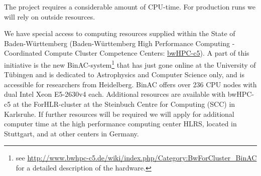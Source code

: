 \documentclass[10pt,fleqn,twoside]{article}
\begin{document}
The project requires a considerable amount of CPU-time. For production runs
we will rely on outside resources. 

We have special access to computing resources supplied within the State of
Baden-W\"urttemberg (Baden-W\"urttemberg High Performance Computing -
Coordinated Compute Cluster Competence Centers:
\href{https://www.bwhpc-c5.de}{bwHPC-c5}).  A part of this initiative is the
new BinAC-system\footnote{see
  \url{http://www.bwhpc-c5.de/wiki/index.php/Category:BwForCluster\_BinAC}
  for a detailed description of the hardware.}  that has just gone online at
the University of T\"ubingen and is dedicated to Astrophysics and Computer
Science only, and is accessible for researchers from Heidelberg.  BinAC
offers over 236 CPU nodes with dual Intel Xeon E5-2630v4 each. Additional
resources are available with bwHPC-c5 at the ForHLR-cluster at the Steinbuch
Centre for Computing (SCC) in Karlsruhe.  If further resources will be
required we will apply for additional computer time at the high performance
computing center HLRS, located in Stuttgart, and at other centers in
Germany.



%



\end{document}
